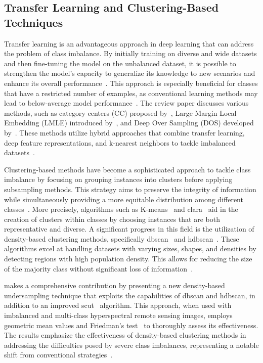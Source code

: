 \subsection{Transfer Learning and Clustering-Based Techniques}
Transfer learning is an advantageous approach in deep learning that can address the problem of class imbalance. By initially training on diverse and wide datasets and then fine-tuning the model on the unbalanced dataset, it is possible to strengthen the model's capacity to generalize its knowledge to new scenarios and enhance its overall performance~\citep{Survey_DL_Taghi_article}. This approach is especially beneficial for classes that have a restricted number of examples, as conventional learning methods may lead to below-average model performance~\citep{Survey_DL_Taghi_article}. The review paper discusses various methods, such as category centers (CC) proposed by~\citet{91_zhang2018image}, Large Margin Local Embedding (LMLE) introduced by~\citet{22_huang2016learning}, and Deep Over Sampling (DOS) developed by~\citet{117_ando2017deep}. These methods utilize hybrid approaches that combine transfer learning, deep feature representations, and k-nearest neighbors to tackle imbalanced datasets~\citep{Survey_DL_Taghi_article}.

Clustering-based methods have become a sophisticated approach to tackle class imbalance by focusing on grouping instances into clusters before applying subsampling methods. This strategy aims to preserve the integrity of information while simultaneously providing a more equitable distribution among different classes~\citep{densitybased_IM_munguia2023density}. More precisely, algorithms such as K-means~\citep{kmeans_kaufman2009finding} and \gls{clara}~\citep{kmeans_kaufman2009finding} aid in the creation of clusters within classes by choosing instances that are both representative and diverse. A significant progress in this field is the utilization of density-based clustering methods, specifically \gls{dbscan}~\citep{DBSCAN_algo_ester1996density} and \gls{hdbscan}~\citep{HDBSCAN_algo_campello2013density}. These algorithms excel at handling datasets with varying sizes, shapes, and densities by detecting regions with high population density. This allows for reducing the size of the majority class without significant loss of information~\citep{densitybased_IM_munguia2023density}.


\citet{densitybased_IM_munguia2023density} makes a comprehensive contribution by presenting a new density-based undersampling technique that exploits the capabilities of \gls{dbscan} and \gls{hdbscan}, in addition to an improved \gls{scut}~\citep{SCUT_agrawal2015scut} algorithm. This approach, when used with imbalanced and multi-class hyperspectral remote sensing images, employs geometric mean values and Friedman's test~\citep{Friedman_Test_7c3c84e5-7230-3033-8b6c-ec430fb73d61} to thoroughly assess its effectiveness. The results emphasize the effectiveness of density-based clustering methods in addressing the difficulties posed by severe class imbalances, representing a notable shift from conventional strategies~\citep{densitybased_IM_munguia2023density}.

